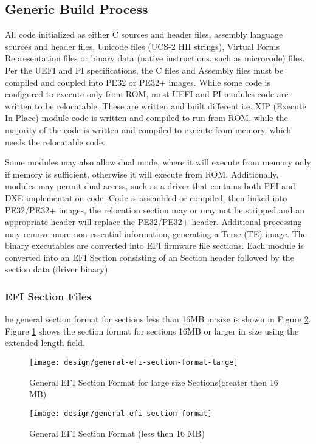 \subsection{Generic Build Process}
All code initialized as either C sources and header files, assembly language sources and header files, Unicode files (UCS-2 HII strings), Virtual Forms Representation files or binary data (native instructions, such as microcode) files. Per the UEFI and PI specifications, the C files and Assembly files must be compiled and coupled into PE32 or PE32+ images.
While some code is configured to execute only from ROM, most UEFI and PI modules code are written to be relocatable. These are written and built different i.e. XIP (Execute In Place) module code is written and compiled to run from ROM, while the majority of the code is written and compiled to execute from memory, which needs the relocatable code.

Some modules may also allow dual mode, where it will execute from memory only if memory is sufficient, otherwise it will execute from ROM. Additionally, modules may permit dual access, such as a driver that contains both PEI and DXE implementation code. Code is assembled or compiled, then linked into PE32/PE32+ images, the relocation section may or may not be stripped and an appropriate header will replace the PE32/PE32+ header. Additional processing may remove more non-essential information, generating a Terse (TE) image.
The binary executables are converted into EFI firmware file sections. Each module is converted into an EFI Section consisting of an Section header followed by the section data (driver binary).

\subsubsection{EFI Section Files}
he general section format for sections less than 16MB in size is shown in Figure \ref{fig:design-general-efi-section-format}. Figure \ref{fig:design-general-efi-section-format-large} shows the section format for sections 16MB or larger in size using the extended length field.

\begin{figure}[h]
	\centering
	\texttt{[image: design/general-efi-section-format-large]}
	\caption{General EFI Section Format for large size Sections(greater then 16 MB)}\label{fig:design-general-efi-section-format-large}
\end{figure}


\begin{figure}[h]
	\centering
	\texttt{[image: design/general-efi-section-format]}
	\caption{General EFI Section Format (less then 16 MB)}\label{fig:design-general-efi-section-format}
\end{figure}

